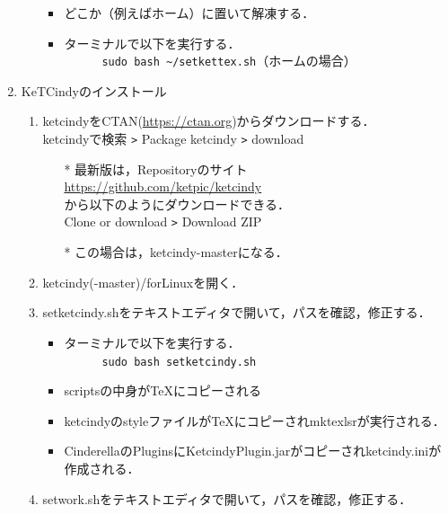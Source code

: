 \documentclass{ujarticle}
\begin{document}
\begin{enumerate}[\bf\large 1.]
\begin{enumerate}[(1)]
    \begin{itemize}
    \item どこか（例えばホーム）に置いて解凍する．
    \item ターミナルで以下を実行する．\\
　　　\verb|sudo bash ~/setkettex.sh|（ホームの場合）
    \end{itemize}

 \end{enumerate}

\item KeTCindyのインストール
  \begin{enumerate}[(1)]
  \item ketcindyをCTAN(\url{https://ctan.org})からダウンロードする．\\
  \hspace*{10mm}ketcindyで検索 \verb|>| Package ketcindy \verb|>| download
    \begin{itemize}
    \item[*]最新版は，Repositoryのサイト\\
        \hspace*{10mm}\url{https://github.com/ket­pic/ketcindy}\\
       から以下のようにダウンロードできる．\\
        \hspace*{10mm}Clone or download \verb|>| Download ZIP
    \item[*]この場合は，ketcindy-masterになる．
    \end{itemize}
  \item ketcindy(-master)/forLinuxを開く．
  \item setketcindy.shをテキストエディタで開いて，パスを確認，修正する．
    \begin{itemize}
    \item ターミナルで以下を実行する．\\
　　　\verb|sudo bash setketcindy.sh|
    \item scriptsの中身が\TeX にコピーされる
    \item ketcindyのstyleファイルが\TeX にコピーされmktexlsrが実行される．
    \item CinderellaのPluginsにKetcindyPlugin.jarがコピーされketcindy.iniが作成される．
    \end{itemize}
  \item setwork.shをテキストエディタで開いて，パスを確認，修正する．
    \begin{itemize}

\end{itemize}
\end{enumerate}
\end{enumerate}
\end{document}
